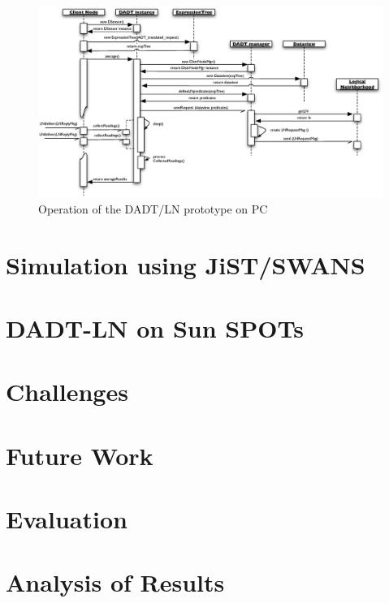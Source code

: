 \begin{figure}[p]
\centering
\label{Fig:SeqDiagram_PCnode}
\includegraphics[scale=0.65, angle=90]{img/SeqDiagram_PCnode.eps} 
\caption[Operation
of the DADT/LN prototype on PC]{Operation
of the DADT/LN prototype on PC}
\end{figure} 

\section{Simulation using JiST/SWANS}

\section{DADT-LN on Sun SPOTs}

\section{Challenges}

\section{Future Work}

\section{Evaluation}

\section{Analysis of Results}


